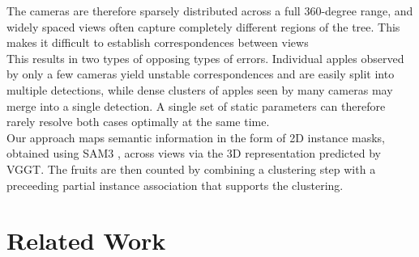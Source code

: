 \documentclass[english, egger, bsc]{vcethesis}
\begin{document}
The cameras are therefore sparsely distributed across a full 360-degree range, and widely spaced views often capture completely different regions of the tree.
This makes it difficult to establish correspondences between views
\\This results in two types of opposing types of errors. Individual apples observed by only a few cameras yield unstable correspondences and are easily split into multiple detections, while dense clusters of apples seen by many 
cameras may merge into a single detection. A single set of static parameters can therefore rarely resolve both cases optimally at the same time. 
\\Our approach maps semantic information in the form of 2D instance masks, obtained using SAM3 \cite{carion2026sam3segmentconcepts}, across views via the 3D representation predicted by VGGT. The fruits are then counted by combining a clustering step with a preceeding partial 
instance association that supports the clustering.
\chapter{Related Work}
\end{document}
